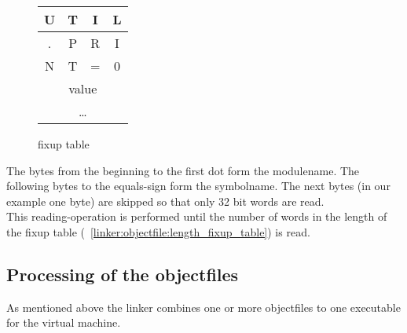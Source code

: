 \begin{figure}[h]
		
	\begin{center}
		\begin{tabular}{|c|c|c|c|}
			\hline
			U & T & I & L \\
			\hline
			. & P & R & I \\
			\hline
			N & T & = & 0 \\
			\hline 
			\multicolumn{4}{|c|}{value} \\
			\hline
			\multicolumn{4}{|c|}{\ldots} \\
			\hline
		\end{tabular}
	\end{center}
	
	\caption{fixup table}
	\label{linker:objectfile:example:fixup_table}
\end{figure}
The bytes from the beginning to the first dot form the modulename. The following
bytes to the equals-sign form the symbolname. The next bytes (in our example one
byte) are skipped so that only 32 bit words are read. \\
This reading-operation is performed until the number of words in the length of
the fixup table (~\ref{linker:objectfile:length_fixup_table}) is read.

\subsection{Processing of the objectfiles}
\label{linker:objectfile_procession}
As mentioned above the linker combines one or more objectfiles to one executable for
the virtual machine.\\ 

